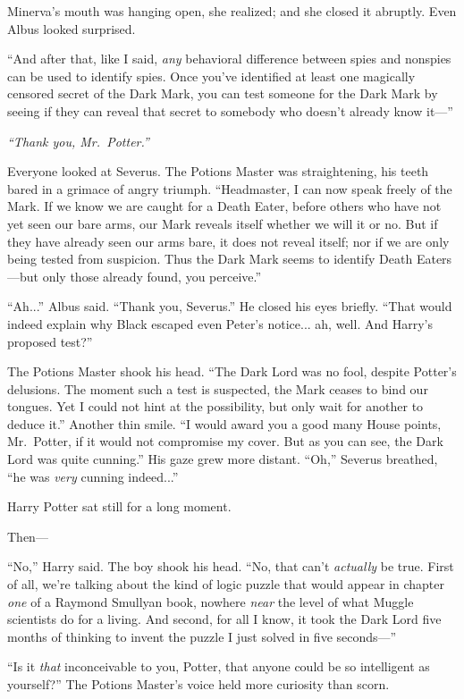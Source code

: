 Minerva’s mouth was hanging open, she realized; and she closed it abruptly. Even Albus looked surprised.

“And after that, like I said, \emph{any} behavioral difference between spies and nonspies can be used to identify spies. Once you’ve identified at least one magically censored secret of the Dark Mark, you can test someone for the Dark Mark by seeing if they can reveal that secret to somebody who doesn’t already know it—”

\emph{“Thank you, Mr.~Potter.”}

Everyone looked at Severus. The Potions Master was straightening, his teeth bared in a grimace of angry triumph. “Headmaster, I can now speak freely of the Mark. If we know we are caught for a Death Eater, before others who have not yet seen our bare arms, our Mark reveals itself whether we will it or no. But if they have already seen our arms bare, it does not reveal itself; nor if we are only being tested from suspicion. Thus the Dark Mark seems to identify Death Eaters—but only those already found, you perceive.”

“Ah...” Albus said. “Thank you, Severus.” He closed his eyes briefly. “That would indeed explain why Black escaped even Peter’s notice... ah, well. And Harry’s proposed test?”

The Potions Master shook his head. “The Dark Lord was no fool, despite Potter’s delusions. The moment such a test is suspected, the Mark ceases to bind our tongues. Yet I could not hint at the possibility, but only wait for another to deduce it.” Another thin smile. “I would award you a good many House points, Mr.~Potter, if it would not compromise my cover. But as you can see, the Dark Lord was quite cunning.” His gaze grew more distant. “Oh,” Severus breathed, “he was \emph{very} cunning indeed...”

Harry Potter sat still for a long moment.

Then—

“No,” Harry said. The boy shook his head. “No, that can’t \emph{actually} be true. First of all, we’re talking about the kind of logic puzzle that would appear in chapter \emph{one} of a Raymond Smullyan book, nowhere \emph{near} the level of what Muggle scientists do for a living. And second, for all I know, it took the Dark Lord five months of thinking to invent the puzzle I just solved in five seconds—”

“Is it \emph{that} inconceivable to you, Potter, that anyone could be so intelligent as yourself?” The Potions Master’s voice held more curiosity than scorn.

